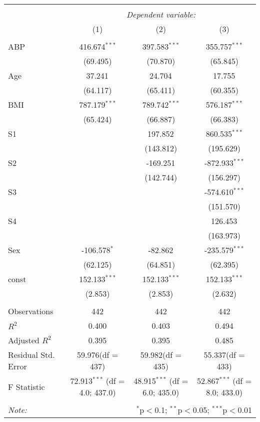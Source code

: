 \begin{table}[!htbp] \centering
\begin{tabular}{@{\extracolsep{5pt}}lccc}
\\[-1.8ex]\hline
\hline \\[-1.8ex]
& \multicolumn{3}{c}{\textit{Dependent variable:}} \
\cr \cline{2-4}
\\[-1.8ex] & (1) & (2) & (3) \\
\hline \\[-1.8ex]
 ABP & 416.674$^{***}$ & 397.583$^{***}$ & 355.757$^{***}$ \\
& (69.495) & (70.870) & (65.845) \\
 Age & 37.241$^{}$ & 24.704$^{}$ & 17.755$^{}$ \\
& (64.117) & (65.411) & (60.355) \\
 BMI & 787.179$^{***}$ & 789.742$^{***}$ & 576.187$^{***}$ \\
& (65.424) & (66.887) & (66.383) \\
 S1 & & 197.852$^{}$ & 860.535$^{***}$ \\
& & (143.812) & (195.629) \\
 S2 & & -169.251$^{}$ & -872.933$^{***}$ \\
& & (142.744) & (156.297) \\
 S3 & & & -574.610$^{***}$ \\
& & & (151.570) \\
 S4 & & & 126.453$^{}$ \\
& & & (163.973) \\
 Sex & -106.578$^{*}$ & -82.862$^{}$ & -235.579$^{***}$ \\
& (62.125) & (64.851) & (62.395) \\
 const & 152.133$^{***}$ & 152.133$^{***}$ & 152.133$^{***}$ \\
& (2.853) & (2.853) & (2.632) \\
\hline \\[-1.8ex]
 Observations & 442 & 442 & 442 \\
 $R^2$ & 0.400 & 0.403 & 0.494 \\
 Adjusted $R^2$ & 0.395 & 0.395 & 0.485 \\
 Residual Std. Error & 59.976(df = 437) & 59.982(df = 435) & 55.337(df = 433)  \\
 F Statistic & 72.913$^{***}$ (df = 4.0; 437.0) & 48.915$^{***}$ (df = 6.0; 435.0) & 52.867$^{***}$ (df = 8.0; 433.0) \\
\hline
\hline \\[-1.8ex]
\textit{Note:} & \multicolumn{3}{r}{$^{*}$p$<$0.1; $^{**}$p$<$0.05; $^{***}$p$<$0.01} \\
\end{tabular}
\end{table}